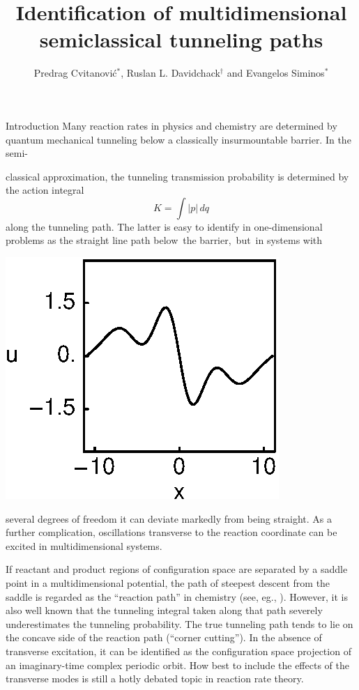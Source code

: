 \documentclass{theo1poster}[2003/04/25]
\title{Identification of multidimensional semiclassical tunneling paths}
\author{Predrag Cvitanovi\'c\ensuremath{^*}, Ruslan L. Davidchack\ensuremath{^\dagger} and Evangelos Siminos\ensuremath{^*}}
\begin{document}
\begin{poster}{3}

\begin{sheet}{Introduction}
Many reaction rates in physics and chemistry are determined by quantum
mechanical tunneling below a classically insurmountable barrier.
In the semi-

\noindent
\begin{minipage}[c]{.49\textwidth}
classical approximation, the tunneling transmission probability is
determined by the action integral
\begin{equation}
  K=\int |p|\,dq
\end{equation}
along the tunneling path. The latter is easy to identify in one-dimensional
problems as the straight line path below\, the barrier,\, but\, in systems
\hfill with
\end{minipage}
\begin{minipage}[c]{.47\textwidth}
\centerline{\includegraphics[width=.95\textwidth]{../../figs/1wKS22equil.eps}}
\end{minipage}
\noindent
several degrees of freedom it can deviate markedly from being straight.
As a further complication, oscillations transverse to the reaction
coordinate can be excited in multidimensional systems.

If reactant and product regions of configuration space are separated by a
saddle point in a multidimensional potential, the path of steepest descent
from the saddle is regarded as the ``reaction path'' in chemistry (see, eg.,
\cite{Truhlar96}). However, it is also well known that the tunneling
integral taken along that path severely underestimates the tunneling
probability. The true tunneling path tends to lie on the concave
side of the reaction path (``corner cutting''). In the absence of
transverse excitation, it can be identified as the configuration space
projection of an imaginary-time complex periodic orbit. How best to include
the effects of the transverse modes is still a hotly debated topic in
reaction rate theory.


\end{sheet}
\end{poster}
\end{document}
